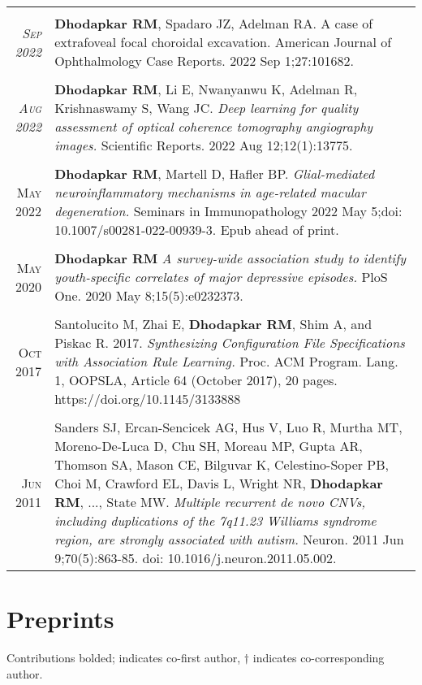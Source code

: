 \documentclass[a4paper,10pt]{article}
\begin{document}
\begin{longtable}{rp{11cm}}
 \\
\multicolumn{2}{c}{} \\
 \textit{\textsc{Sep} 2022}& {\bf Dhodapkar RM}, Spadaro JZ, Adelman RA. A case of extrafoveal focal choroidal excavation. American Journal of Ophthalmology Case Reports. 2022 Sep 1;27:101682. \\
\multicolumn{2}{c}{} \\
 \textit{\textsc{Aug 2022}}& {\bf Dhodapkar RM}, Li E, Nwanyanwu K, Adelman R, Krishnaswamy S, Wang JC. {\it Deep learning for quality assessment of optical coherence tomography angiography images.} Scientific Reports. 2022 Aug 12;12(1):13775. \\
\multicolumn{2}{c}{} \\
 \textsc{May} 2022 & {\bf Dhodapkar RM}, Martell D, Hafler BP. {\it Glial-mediated neuroinflammatory mechanisms in age-related macular degeneration.} Seminars in Immunopathology 2022 May 5;doi: 10.1007/s00281-022-00939-3. Epub ahead of print. \\
\multicolumn{2}{c}{} \\
 \textsc{May} 2020 & {\bf Dhodapkar RM} {\it A survey-wide association study to identify youth-specific correlates of major depressive episodes.} PloS One. 2020 May 8;15(5):e0232373. \\
\multicolumn{2}{c}{} \\
 \textsc{Oct} 2017 & Santolucito M, Zhai E, {\bf Dhodapkar RM}, Shim A, and Piskac R. 2017. {\it Synthesizing Configuration
File Specifications with Association Rule Learning.} Proc. ACM Program. Lang. 1, OOPSLA, Article 64
(October 2017), 20 pages. https://doi.org/10.1145/3133888 \\
\multicolumn{2}{c}{} \\
 \textsc{Jun} 2011 & Sanders SJ, Ercan-Sencicek AG, Hus V, Luo R, Murtha MT, Moreno-De-Luca D, Chu SH, Moreau MP, Gupta AR, Thomson SA, Mason CE, Bilguvar K, Celestino-Soper PB, Choi M, Crawford EL, Davis L, Wright NR, {\bf Dhodapkar RM}, ..., State MW. {\it Multiple recurrent de novo CNVs, including duplications of the 7q11.23 Williams syndrome region, are strongly associated with autism.} Neuron. 2011 Jun 9;70(5):863-85. doi: 10.1016/j.neuron.2011.05.002. 
\end{longtable}

\section{Preprints}
Contributions bolded; {\bf *} indicates co-first author, {\bf $\dag$} indicates co-corresponding author. 
\end{document}
